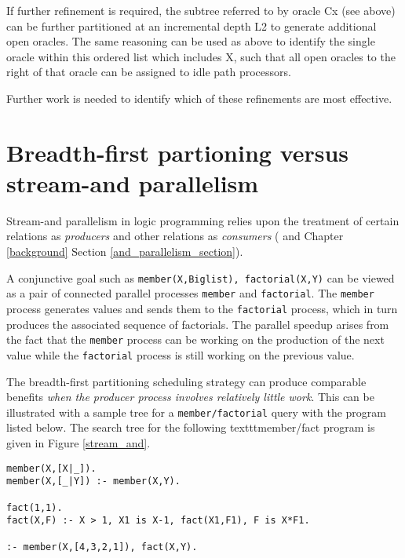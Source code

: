 If further refinement is required, the subtree referred to by oracle Cx (see above) can
be further partitioned at an incremental depth L2 to generate additional open oracles.
The same reasoning can be used as above to identify the single oracle within this ordered
list which includes X, such that all open oracles to the right of that oracle can be
assigned to idle path processors.

Further work is needed to identify which of these refinements are most effective.

\section{Breadth-first partioning versus stream-and parallelism} %
\label{bfp_stream_and}

Stream-and parallelism in logic programming relies upon the treatment of
certain relations as \textit{producers} and other relations as \textit{consumers}
(\cite{New90} and Chapter \ref{background} Section \ref{and_parallelism_section}).

A conjunctive goal such as \texttt{member(X,Biglist), factorial(X,Y)} can be
viewed as a pair of connected parallel processes \texttt{member} and
\texttt{factorial}.  The \texttt{member} process generates values and sends them
to the \texttt{factorial} process, which in turn produces the associated sequence
of factorials.  The parallel speedup arises from the fact that the \texttt{member}
process can be working on the production of the next value while the \texttt{factorial}
process is still working on the previous value.

The breadth-first partitioning scheduling strategy can produce comparable benefits
\textit{when the producer process involves relatively little work}.
This can be illustrated with
a sample tree for a \texttt{member/factorial} query with the program listed below.
The search tree for the following texttt{member/fact} program is given in
Figure \ref{stream_and}.

\begin{verbatim}
member(X,[X|_]).
member(X,[_|Y]) :- member(X,Y).

fact(1,1).
fact(X,F) :- X > 1, X1 is X-1, fact(X1,F1), F is X*F1.

:- member(X,[4,3,2,1]), fact(X,Y).
\end{verbatim}

